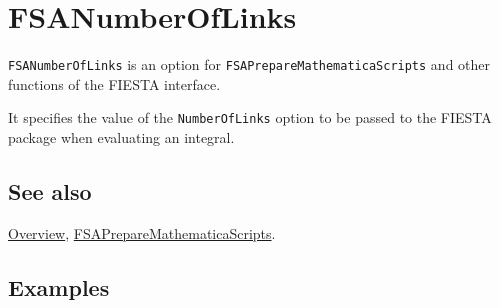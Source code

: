 \documentclass[../FeynHelpersManual.tex]{subfiles}
\begin{document}
\begin{Shaded}
\begin{Highlighting}[]
 
\end{Highlighting}
\end{Shaded}

\hypertarget{fsanumberoflinks}{
\section{FSANumberOfLinks}\label{fsanumberoflinks}}

\texttt{FSANumberOfLinks} is an option for
\texttt{FSAPrepareMathematicaScripts} and other functions of the FIESTA
interface.

It specifies the value of the \texttt{NumberOfLinks} option to be passed
to the FIESTA package when evaluating an integral.

\subsection{See also}

\hyperlink{toc}{Overview},
\hyperlink{fsapreparemathematicascripts}{FSAPrepareMathematicaScripts}.

\subsection{Examples}
\end{document}
